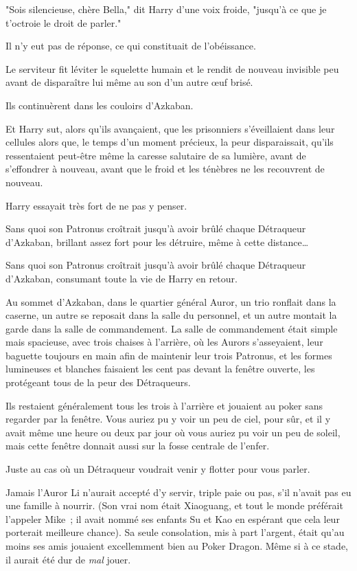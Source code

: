 "Sois silencieuse, chère Bella," dit Harry d'une voix froide, "jusqu'à ce que je t'octroie le droit de parler."

Il n'y eut pas de réponse, ce qui constituait de l'obéissance.

Le serviteur fit léviter le squelette humain et le rendit de nouveau invisible peu avant de disparaître lui même au son d'un autre œuf brisé.

Ils continuèrent dans les couloirs d'Azkaban.

Et Harry sut, alors qu'ils avançaient, que les prisonniers s'éveillaient dans leur cellules alors que, le temps d'un moment précieux, la peur disparaissait, qu'ils ressentaient peut-être même la caresse salutaire de sa lumière, avant de s'effondrer à nouveau, avant que le froid et les ténèbres ne les recouvrent de nouveau.

Harry essayait très fort de ne pas y penser.

Sans quoi son Patronus croîtrait jusqu'à avoir brûlé chaque Détraqueur d'Azkaban, brillant assez fort pour les détruire, même à cette distance…

Sans quoi son Patronus croîtrait jusqu'à avoir brûlé chaque Détraqueur d'Azkaban, consumant toute la vie de Harry en retour.

\later

Au sommet d'Azkaban, dans le quartier général Auror, un trio ronflait dans la caserne, un autre se reposait dans la salle du personnel, et un autre montait la garde dans la salle de commandement. La salle de commandement était simple mais spacieuse, avec trois chaises à l'arrière, où les Aurors s'asseyaient, leur baguette toujours en main afin de maintenir leur trois Patronus, et les formes lumineuses et blanches faisaient les cent pas devant la fenêtre ouverte, les protégeant tous de la peur des Détraqueurs.

Ils restaient généralement tous les trois à l'arrière et jouaient au poker sans regarder par la fenêtre. Vous auriez pu y voir un peu de ciel, pour sûr, et il y avait même une heure ou deux par jour où vous auriez pu voir un peu de soleil, mais cette fenêtre donnait aussi sur la fosse centrale de l'enfer.

Juste au cas où un Détraqueur voudrait venir y flotter pour vous parler.

Jamais l'Auror Li n'aurait accepté d'y servir, triple paie ou pas, s'il n'avait pas eu une famille à nourrir. (Son vrai nom était Xiaoguang, et tout le monde préférait l'appeler Mike~; il avait nommé ses enfants Su et Kao en espérant que cela leur porterait meilleure chance). Sa seule consolation, mis à part l'argent, était qu'au moins ses amis jouaient excellemment bien au Poker Dragon. Même si à ce stade, il aurait été dur de \emph{mal} jouer.

